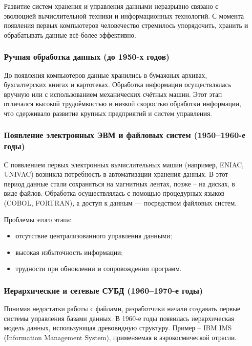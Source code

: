 Развитие систем хранения и управления данными неразрывно связано с эволюцией вычислительной техники и информационных технологий. С момента появления первых компьютеров человечество стремилось упорядочить, хранить и обрабатывать данные всё более эффективно.

\subsubsection{Ручная обработка данных (до 1950-х годов)}

До появления компьютеров данные хранились в бумажных архивах, бухгалтерских книгах и картотеках. Обработка информации осуществлялась вручную или с использованием механических счётных машин. Этот этап отличался высокой трудоёмкостью и низкой скоростью обработки информации, что сдерживало развитие крупных предприятий и систем управления.

\subsubsection{Появление электронных ЭВМ и файловых систем (1950--1960-е годы)}

С появлением первых электронных вычислительных машин (например, ENIAC, UNIVAC) возникла потребность в автоматизации хранения данных. В этот период данные стали сохраняться на магнитных лентах, позже -- на дисках, в виде файлов. Обработка осуществлялась с помощью процедурных языков (COBOL, FORTRAN), а доступ к данным — посредством файловых систем.

Проблемы этого этапа:
\begin{itemize}
	\item отсутствие централизованного управления данными;
	\item высокая избыточность информации;
	\item трудности при обновлении и сопровождении программ.
\end{itemize}

\subsubsection{Иерархические и сетевые СУБД (1960--1970-е годы)}

Понимая недостатки работы с файлами, разработчики начали создавать первые системы управления базами данных. В 1960-е годы появилась иерархическая модель данных, использующая древовидную структуру. Пример -- IBM IMS (Information Management System), применяемая в аэрокосмической отрасли.

